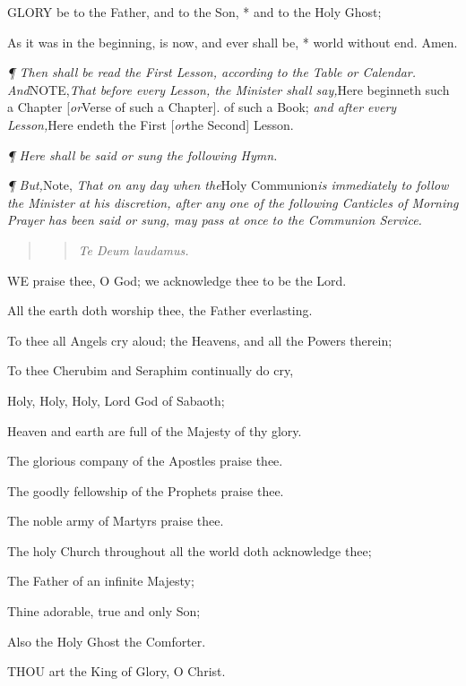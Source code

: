 GLORY
be to the Father, and to the Son, * and to the Holy Ghost;

As it was in the beginning, is now, and ever shall
be, * world without end. Amen.

\emph{¶
Then shall be read the First Lesson, according to the Table or Calendar.
And}NOTE,\emph{That before every Lesson, the
Minister shall say,}Here beginneth such a Chapter [\emph{or}Verse
of such a Chapter]. of such a Book; \emph{and after every Lesson,}Here
endeth the First [\emph{or}the Second] Lesson.

\emph{¶
Here shall be said or sung the following Hymn.}

\emph{¶
But,}Note,
\emph{That on any day when the}Holy Communion\emph{is immediately to
follow the Minister at his discretion, after any one of the following
Canticles of Morning Prayer has been said or sung, may pass at once to
the Communion Service.}

\begin{quote}

\begin{quote}

\emph{Te
Deum laudamus.}

\end{quote}

\end{quote}

WE
praise thee, O God; we acknowledge thee to be the Lord.

All the earth doth worship thee, the Father everlasting.

To thee all Angels cry aloud; the Heavens, and all
the Powers therein;

To thee Cherubim and Seraphim continually do cry,

Holy, Holy, Holy, Lord God of Sabaoth;

Heaven and earth are full of the Majesty of thy glory.

The glorious company of the Apostles praise thee.

The goodly fellowship of the Prophets praise thee.

The noble army of Martyrs praise thee.

The holy Church throughout all the world doth acknowledge
thee;

The Father of an infinite Majesty;

Thine adorable, true and only Son;

Also the Holy Ghost the Comforter.

THOU
art the King of Glory, O Christ.

